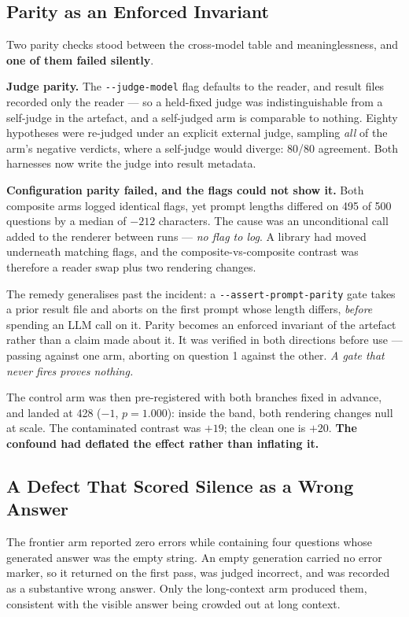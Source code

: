 \subsection{Parity as an Enforced Invariant}

Two parity checks stood between the cross-model table and meaninglessness, and \textbf{one of them failed silently}.

\textbf{Judge parity.} The \texttt{-{}-judge-model} flag defaults to the reader, and result files recorded only the reader --- so a held-fixed judge was indistinguishable from a self-judge in the artefact, and a self-judged arm is comparable to nothing. Eighty hypotheses were re-judged under an explicit external judge, sampling \emph{all} of the arm's negative verdicts, where a self-judge would diverge: 80/80 agreement. Both harnesses now write the judge into result metadata.

\textbf{Configuration parity failed, and the flags could not show it.} Both composite arms logged identical flags, yet prompt lengths differed on 495 of 500 questions by a median of $-212$ characters. The cause was an unconditional call added to the renderer between runs --- \emph{no flag to log}. A library had moved underneath matching flags, and the composite-vs-composite contrast was therefore a reader swap plus two rendering changes.

The remedy generalises past the incident: a \texttt{-{}-assert-prompt-parity} gate takes a prior result file and aborts on the first prompt whose length differs, \emph{before} spending an LLM call on it. Parity becomes an enforced invariant of the artefact rather than a claim made about it. It was verified in both directions before use --- passing against one arm, aborting on question 1 against the other. \emph{A gate that never fires proves nothing.}

The control arm was then pre-registered with both branches fixed in advance, and landed at 428 ($-1$, $p = 1.000$): inside the band, both rendering changes null at scale. The contaminated contrast was $+19$; the clean one is $+20$. \textbf{The confound had deflated the effect rather than inflating it.}

\subsection{A Defect That Scored Silence as a Wrong Answer}

The frontier arm reported zero errors while containing four questions whose generated answer was the empty string. An empty generation carried no error marker, so it returned on the first pass, was judged incorrect, and was recorded as a substantive wrong answer. Only the long-context arm produced them, consistent with the visible answer being crowded out at long context.

